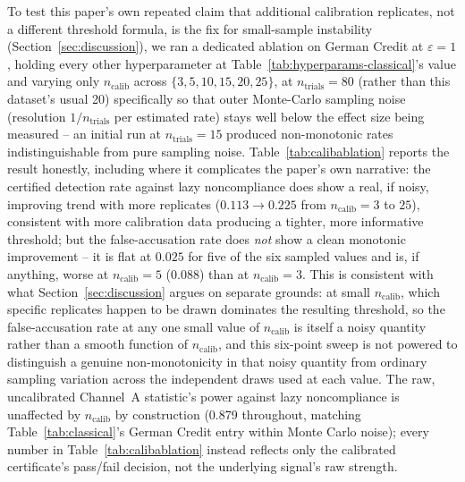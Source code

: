 \documentclass[10pt,journal,compsoc]{IEEEtran}
\begin{document}
To test this paper's own repeated claim that additional calibration replicates, not a different threshold formula, is the fix for small-sample instability (Section~\ref{sec:discussion}), we ran a dedicated ablation on German Credit at $\varepsilon=1$, holding every other hyperparameter at Table~\ref{tab:hyperparams-classical}'s value and varying only $n_{\text{calib}}$ across $\{3,5,10,15,20,25\}$, at $n_{\text{trials}}=80$ (rather than this dataset's usual 20) specifically so that outer Monte-Carlo sampling noise (resolution $1/n_{\text{trials}}$ per estimated rate) stays well below the effect size being measured -- an initial run at $n_{\text{trials}}=15$ produced non-monotonic rates indistinguishable from pure sampling noise. Table~\ref{tab:calibablation} reports the result honestly, including where it complicates the paper's own narrative: the certified detection rate against lazy noncompliance does show a real, if noisy, improving trend with more replicates ($0.113\to0.225$ from $n_{\text{calib}}=3$ to $25$), consistent with more calibration data producing a tighter, more informative threshold; but the false-accusation rate does \emph{not} show a clean monotonic improvement -- it is flat at $0.025$ for five of the six sampled values and is, if anything, worse at $n_{\text{calib}}=5$ ($0.088$) than at $n_{\text{calib}}=3$. This is consistent with what Section~\ref{sec:discussion} argues on separate grounds: at small $n_{\text{calib}}$, which specific replicates happen to be drawn dominates the resulting threshold, so the false-accusation rate at any one small value of $n_{\text{calib}}$ is itself a noisy quantity rather than a smooth function of $n_{\text{calib}}$, and this six-point sweep is not powered to distinguish a genuine non-monotonicity in that noisy quantity from ordinary sampling variation across the independent draws used at each value. The raw, uncalibrated Channel~A statistic's power against lazy noncompliance is unaffected by $n_{\text{calib}}$ by construction (0.879 throughout, matching Table~\ref{tab:classical}'s German Credit entry within Monte Carlo noise); every number in Table~\ref{tab:calibablation} instead reflects only the calibrated certificate's pass/fail decision, not the underlying signal's raw strength.
\end{document}
